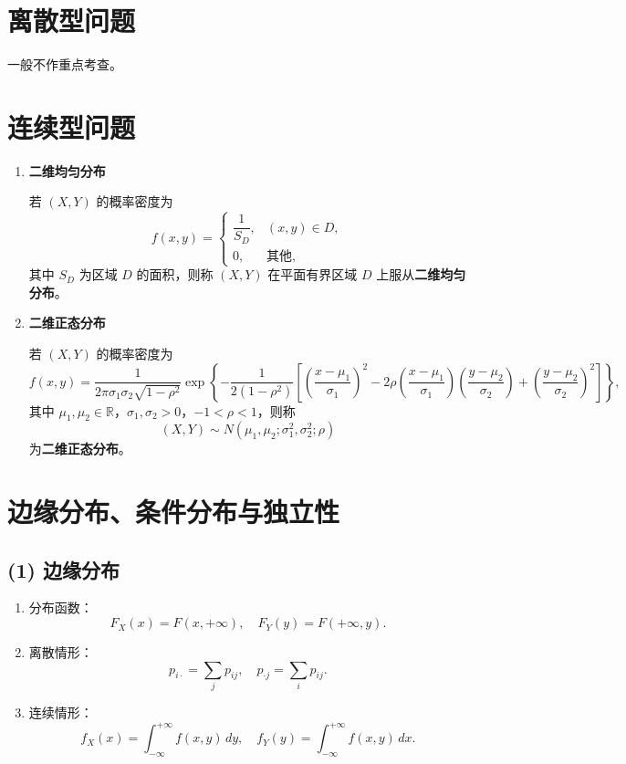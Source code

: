 
\section{离散型问题}
一般不作重点考查。

\section{连续型问题}
\begin{enumerate}
      \item \textbf{二维均匀分布}

            若 $(X,Y)$ 的概率密度为
            $$
                  f(x,y)=
                  \begin{cases}
                        \dfrac{1}{S_D}, & (x,y)\in D, \\
                        0,              & \text{其他,}
                  \end{cases}
            $$
            其中 $S_D$ 为区域 $D$ 的面积，则称 $(X,Y)$ 在平面有界区域 $D$ 上服从\textbf{二维均匀分布}。

      \item \textbf{二维正态分布}

            若 $(X,Y)$ 的概率密度为
            $$
                  f(x,y)=\frac{1}{2\pi\sigma_1\sigma_2\sqrt{1-\rho^2}}
                  \exp\!\left\{
                  -\frac{1}{2(1-\rho^2)}
                  \left[
                        \left(\frac{x-\mu_1}{\sigma_1}\right)^2
                        -2\rho\!\left(\frac{x-\mu_1}{\sigma_1}\right)\!\left(\frac{y-\mu_2}{\sigma_2}\right)
                        +\left(\frac{y-\mu_2}{\sigma_2}\right)^2
                        \right]
                  \right\},
            $$
            其中 $\mu_1,\mu_2\in\mathbb{R}$，$\sigma_1,\sigma_2>0$，$-1<\rho<1$，则称
            $$
                  (X,Y)\sim N(\mu_1,\mu_2;\sigma_1^2,\sigma_2^2;\rho)
            $$
            为\textbf{二维正态分布}。
\end{enumerate}

\section{边缘分布、条件分布与独立性}

\subsection*{(1) 边缘分布}
\begin{enumerate}
      \item 分布函数：
            $$
                  F_X(x)=F(x,+\infty), \quad F_Y(y)=F(+\infty,y).
            $$
      \item 离散情形：
            $$
                  p_{i\cdot}=\sum_j p_{ij}, \quad p_{\cdot j}=\sum_i p_{ij}.
            $$
      \item 连续情形：
            $$
                  f_X(x)=\int_{-\infty}^{+\infty} f(x,y)\,dy, \quad
                  f_Y(y)=\int_{-\infty}^{+\infty} f(x,y)\,dx.
            $$
\end{enumerate}

